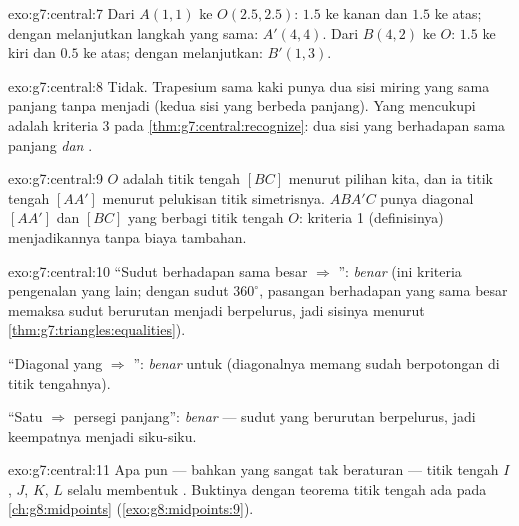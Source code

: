 \begin{solution}{exo:g7:central:7}
Dari $A(1,1)$ ke $O(2.5, 2.5)$: $1.5$ ke kanan dan $1.5$ ke atas;
dengan melanjutkan langkah yang sama: $A'(4, 4)$. Dari $B(4,2)$ ke
$O$: $1.5$ ke kiri dan $0.5$ ke atas; dengan melanjutkan: $B'(1, 3)$.
\end{solution}

\begin{solution}{exo:g7:central:8}
Tidak. Trapesium sama kaki punya dua sisi miring yang sama panjang
tanpa menjadi  (kedua sisi yang  berbeda panjang).
Yang mencukupi adalah kriteria 3 pada
\cref{thm:g7:central:recognize}: dua sisi yang berhadapan sama panjang
\emph{dan }.
\end{solution}

\begin{solution}{exo:g7:central:9}
$O$ adalah titik tengah $[BC]$ menurut pilihan kita, dan ia titik
tengah $[AA']$ menurut pelukisan titik simetrisnya. 
$ABA'C$ punya diagonal $[AA']$ dan $[BC]$ yang berbagi titik tengah
$O$: kriteria 1 (definisinya) menjadikannya  tanpa biaya
tambahan.
\end{solution}

\begin{solution}{exo:g7:central:10}
``Sudut berhadapan sama besar $\Rightarrow$ '':
\emph{benar} (ini kriteria pengenalan yang lain; dengan  sudut
$360^\circ$, pasangan berhadapan yang sama besar memaksa sudut
berurutan menjadi berpelurus, jadi sisinya  menurut
\cref{thm:g7:triangles:equalities}).

``Diagonal yang  $\Rightarrow$ '':
\emph{benar} untuk  (diagonalnya memang sudah berpotongan
di titik tengahnya).

``Satu  $\Rightarrow$ persegi panjang'': \emph{benar}
--- sudut yang berurutan berpelurus, jadi keempatnya menjadi siku-siku.
\end{solution}

\begin{solution}{exo:g7:central:11}
Apa pun  --- bahkan yang sangat tak beraturan --- titik
tengah $I$, $J$, $K$, $L$ selalu membentuk \emph{}.
Buktinya dengan teorema titik tengah ada pada \cref{ch:g8:midpoints}
(\cref{exo:g8:midpoints:9}).
\end{solution}

